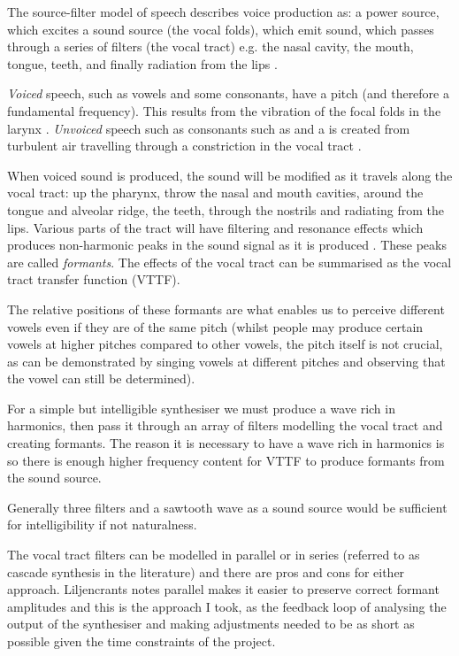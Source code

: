 The source-filter model of speech describes voice production as: a power source, which excites a sound source (the vocal folds), which emit sound, which passes through a series of filters (the vocal tract) e.g. the nasal cavity, the mouth, tongue, teeth, and finally radiation from the lips \cite{Howard2008}.

\textit{Voiced} speech, such as vowels and some consonants, have a pitch (and therefore a fundamental frequency). This results from the vibration of the focal folds in the larynx \cite{Howard2008}. \textit{Unvoiced} speech such as consonants such as  and a  is created from turbulent air travelling through a constriction in the vocal tract \cite{Howard2008,Narayanan2000,Johnson2003}.

When voiced sound is produced, the sound will be modified as it travels along the vocal tract: up the pharynx, throw the nasal and mouth cavities, around the tongue and alveolar ridge, the teeth, through the nostrils and radiating from the lips. Various parts of the tract will have filtering and resonance effects which produces non-harmonic peaks in the sound signal as it is produced \cite{Johnson2003}. These peaks are called \textit{formants}. The effects of the vocal tract can be summarised as the vocal tract transfer function (VTTF).

The relative positions of these formants are what enables us to perceive different vowels even if they are of the same pitch (whilst people may produce certain vowels at higher pitches compared to other vowels, the pitch itself is not crucial, as can be demonstrated by singing vowels at different pitches and observing that the vowel can still be determined).

For a simple but intelligible synthesiser we must produce a wave rich in harmonics, then pass it through an array of filters modelling the vocal tract and creating formants. The reason it is necessary to have a wave rich in harmonics is so there is enough higher frequency content for VTTF to produce formants from the sound source.

Generally three filters and a sawtooth wave as a sound source would be sufficient for intelligibility if not naturalness.

The vocal tract filters can be modelled in parallel or in series (referred to as cascade synthesis in the literature) and there are pros and cons for either approach. Liljencrants \cite{Liljencrants1995} notes parallel makes it easier to preserve correct formant amplitudes and this is the approach I took, as the feedback loop of analysing the output of the synthesiser and making adjustments needed to be as short as possible given the time constraints of the project.

